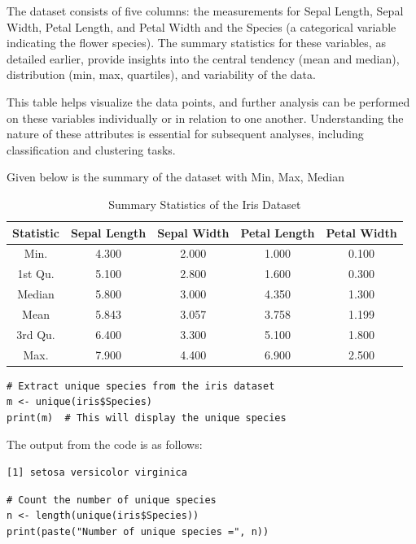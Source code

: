 \documentclass[a4paper,12pt]{article}
\begin{document}
The dataset consists of five columns: the measurements for Sepal Length, Sepal Width, Petal Length, and Petal Width and the Species (a categorical variable indicating the flower species). The summary statistics for these variables, as detailed earlier, provide insights into the central tendency (mean and median), distribution (min, max, quartiles), and variability of the data.

This table helps visualize the data points, and further analysis can be performed on these variables individually or in relation to one another. Understanding the nature of these attributes is essential for subsequent analyses, including classification and clustering tasks.

\newpage
Given below is the summary of the dataset with Min, Max, Median 

\begin{table}[ht]
    \centering
    \begin{tabular}{|c|c|c|c|c|}
    \hline
    Statistic & Sepal Length & Sepal Width & Petal Length & Petal Width \\
    \hline
    Min.      & 4.300        & 2.000       & 1.000        & 0.100       \\
    1st Qu.   & 5.100        & 2.800       & 1.600        & 0.300       \\
    Median    & 5.800        & 3.000       & 4.350        & 1.300       \\
    Mean      & 5.843        & 3.057       & 3.758        & 1.199       \\
    3rd Qu.   & 6.400        & 3.300       & 5.100        & 1.800       \\
    Max.      & 7.900        & 4.400       & 6.900        & 2.500       \\
    \hline
    \end{tabular}
    \caption{Summary Statistics of the Iris Dataset}
\end{table}

\begin{lstlisting}[style=RStyle]
# Extract unique species from the iris dataset
m <- unique(iris$Species)
print(m)  # This will display the unique species
\end{lstlisting}

The output from the code is as follows:

\begin{verbatim}
[1] setosa versicolor virginica
\end{verbatim}

\begin{lstlisting}[style=RStyle]
# Count the number of unique species
n <- length(unique(iris$Species))
print(paste("Number of unique species =", n))
\end{lstlisting}
\end{document}
